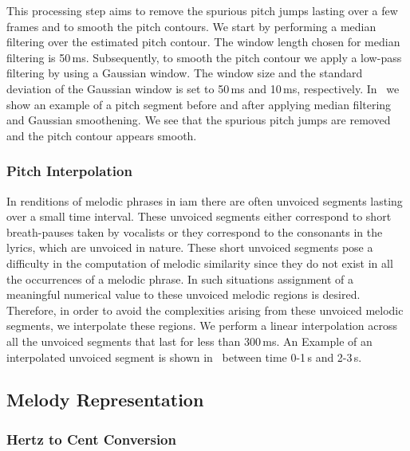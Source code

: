 {This processing step aims to remove the spurious pitch jumps lasting over a few frames and to smooth the pitch contours. We start by performing a median filtering over the estimated pitch contour. The window length chosen for median filtering is 50\,ms. Subsequently, to smooth the pitch contour we apply a low-pass filtering by using a Gaussian window. The window size and the standard deviation of the Gaussian window is set to 50\,ms and 10\,ms, respectively. In~ we show an example of a pitch segment before and after applying median filtering and Gaussian smoothening. We see that the spurious pitch jumps are removed and the pitch contour appears smooth.



\subsubsection{Pitch Interpolation}
\label{sec:data_processing_pitch_interpolation}

In renditions of melodic phrases in \gls{iam} there are often unvoiced segments lasting over a small time interval. These unvoiced segments either correspond to short breath-pauses taken by vocalists or they correspond to the consonants in the lyrics, which are unvoiced in nature. These short unvoiced segments pose a difficulty in the computation of melodic similarity since they do not exist in all the occurrences of a melodic phrase. In such situations assignment of a meaningful numerical value to these unvoiced melodic regions is desired. Therefore, in order to avoid the complexities arising from these unvoiced melodic segments, we interpolate these regions. We perform a linear interpolation across all the unvoiced segments that last for less than 300\,ms. An Example of an interpolated unvoiced segment is shown in~ between time 0-1\,s and 2-3\,s.


\subsection{Melody Representation} 
\label{sec:pre_processing_melody_representation}


\subsubsection{Hertz to Cent Conversion}
\label{sec:data_processing_cent_conversion}

}
